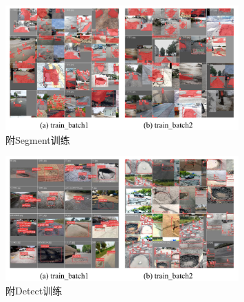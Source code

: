 \documentclass{MathorCupmodeling}
\begin{document}
\newpage
\begin{figure}[H]
	\centering
	\includegraphics[width=0.8\textwidth]{Figures/segment/附Segment训练.pdf}
	\caption{附Segment训练}
	\label{fig:附Segment训练}
\end{figure}
\begin{figure}[H]
	\centering
	\includegraphics[width=0.8\textwidth]{Figures/detect/附Detect训练.pdf}
	\caption{附Detect训练}
	\label{fig:附Detect训练}
\end{figure}
\end{document}
